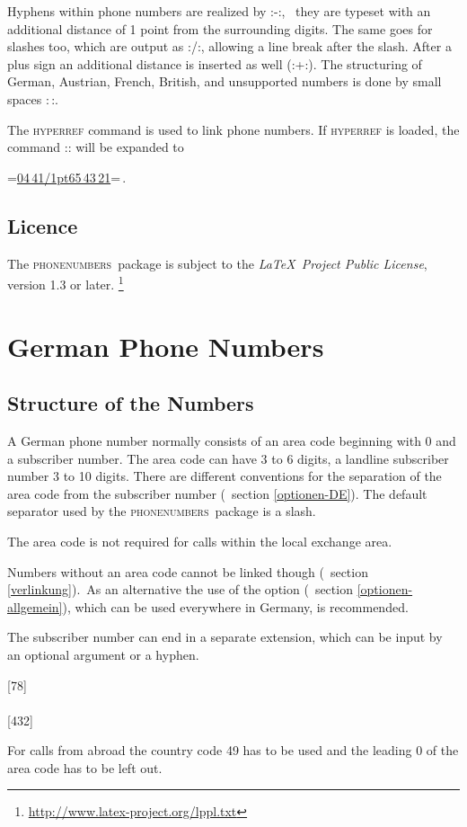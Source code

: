 \documentclass[numbers=noenddot]{scrreprt}
\newcommand\Abschnittsliteratur[1]{\bgroup
\small
\raggedright
\printbibliography[heading=subbibnumbered,keyword=#1]
\egroup}
\newcommand*\Paket[1]{\textsc{#1}}
\newcommand\phone{\textcolor{cnltx}{\Paket{phone\-numbers}}}
\newcommand\UeberschriftAufbau{\section{Structure of the Numbers}}
\newcommand\KeineVerlinkung{Numbers without an area code cannot be linked though
\vglAbschnitt{verlinkung}.}
\newcommand*\vglAbschnitt[1]{(\cf\ section \ref{#1})}
\newcommand*\AufbauDEATA[6]{ #1 phone number normally consists of an area code beginning with 0 and a subscriber number. The area code can have #2 to #3 digits, a landline subscriber number #4 to #5 digits. There are different conventions for the separation of the area code from the subscriber number
\vglAbschnitt{#6}.
The default separator used by the \phone\ package is a slash.}
\newcommand\AufbauDEATB{The area code is not required for calls within the local exchange area.}
\newcommand\AufbauDEATC[1]{\KeineVerlinkung\ As an alternative the use of the \option{home-area-code} option
\vglAbschnitt{optionen-allgemein},
which can be used everywhere in #1, is recommended.\par
The subscriber number can end in a separate extension, which can be input by an optional argument or a hyphen.}
\newcommand*\AufbauDEATD[1]{For calls from abroad the country code #1 has to be used and the leading 0 of the area code has to be left out.}
\begin{document}
Hyphens within phone numbers are realized by
\verbcode:\kern1pt-\kern1pt:, \ie\ they are typeset with an additional distance of 1 point from the surrounding digits. The same goes for slashes too, which are output as
\verbcode:\kern1pt\slash\kern1pt:, allowing a line break after the slash. After a plus sign an additional distance is inserted as well
(\verbcode:+\kern1pt:).
The structuring of German, Austrian, French, British, and unsupported numbers is done by small spaces
\verbcode:\,:.

The \Paket{hyperref} command  is used to link phone numbers. If \Paket{hyperref} is loaded, the command
\verbcode::
will be expanded to
\begin{center}
\verbcode=\href{tel:+49441654321}{04\,41\kern1pt\slash\kern1pt65\,43\,21}=\,.
\end{center}


\section{Licence}
The \phone\ package is subject to the
\emph{\LaTeX\ Project Public License},
version 1.3 or later.%
\footnote{\url{http://www.latex-project.org/lppl.txt}}

\Abschnittsliteratur{general}

\chapter{German Phone Numbers}
\UeberschriftAufbau
\AufbauDEATA{A German}{3}{6}{3}{10}{optionen-DE}
\begin{sidebyside}
\end{sidebyside}

\AufbauDEATB
\begin{sidebyside}
\end{sidebyside}
\AufbauDEATC{Germany}
\begin{sidebyside}
  [78] \\
   \\
  [432] \\
\end{sidebyside}

\AufbauDEATD{49}
\begin{sidebyside}
\end{sidebyside}
\end{document}
